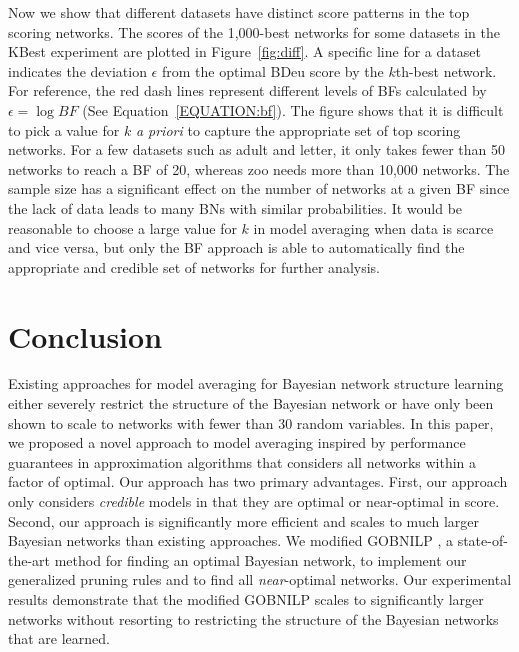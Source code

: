 \documentclass[letterpaper]{article}
\begin{document}
Now we show that different datasets have distinct score patterns in the top scoring networks. The scores of the 1,000-best networks for some datasets in the KBest experiment are plotted in Figure~\ref{fig:diff}. A specific line for a dataset indicates the deviation $\epsilon$ from the optimal BDeu score by the $k$th-best network. For reference, the red dash lines represent different levels of BFs calculated by $\epsilon=\log{BF}$ (See Equation~\ref{EQUATION:bf}). The figure shows that it is difficult to pick a value for $k$ \emph{a priori} to capture the appropriate set of top scoring networks. For a few datasets such as adult and letter, it only takes fewer than 50 networks to reach a BF of 20, whereas zoo needs more than 10,000 networks. The sample size has a significant effect on the number of networks at a given BF since the lack of data leads to many BNs with similar probabilities. It would be reasonable to choose a large value for $k$ in model averaging when data is scarce and vice versa, but only the BF approach is able to automatically find the appropriate and credible set of networks for further analysis.

\section{Conclusion}\label{sec:conclusion}

Existing approaches for model averaging for Bayesian network structure learning
either severely restrict the structure of the Bayesian network
or have only been shown to scale to networks with fewer than 30 random
variables. In this paper, we proposed a novel approach to model
averaging inspired by performance guarantees in approximation
algorithms that considers all networks within a factor of optimal. 
Our approach has two primary advantages. First,
our approach only considers \emph{credible} models in that they
are optimal or near-optimal in score. Second, our approach
is significantly more efficient and scales to much larger
Bayesian networks than existing approaches.
We modified GOBNILP \cite{BartlettC13}, a state-of-the-art method for finding
an optimal Bayesian network, to implement our generalized pruning rules
and to find all \emph{near}-optimal networks. Our experimental results demonstrate
that the modified GOBNILP scales to significantly
larger networks without resorting to restricting the structure 
of the Bayesian networks that are learned.
\end{document}
